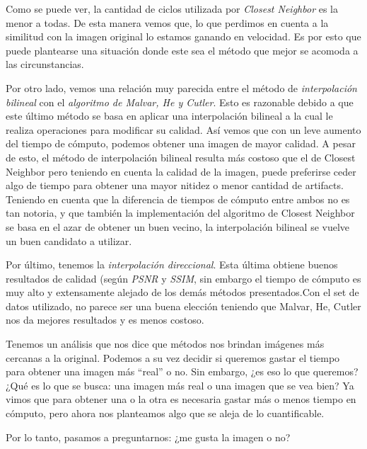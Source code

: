 \begin{itemize}
\vspace{\baselineskip}

Como se puede ver, la cantidad de ciclos utilizada por \textit{Closest Neighbor} es la menor a todas. De esta manera vemos que, lo que perdimos en cuenta a la similitud con la imagen original lo estamos ganando en velocidad. Es por esto que puede plantearse una situación donde este sea el método que mejor se acomoda a las circunstancias. 

\vspace{\baselineskip}

Por otro lado, vemos una relación muy parecida entre el método de \textit{interpolación bilineal} con el \textit{algoritmo de Malvar, He y Cutler}. Esto es razonable debido a que este último método se basa en aplicar una interpolación bilineal a la cual le realiza operaciones para modificar su calidad. Así vemos que con un leve aumento del tiempo de cómputo, podemos obtener una imagen de mayor calidad. A pesar de esto, el método de interpolación bilineal resulta más costoso que el de Closest Neighbor pero teniendo en cuenta la calidad de la imagen, puede preferirse ceder algo de tiempo para obtener una mayor nitidez o menor cantidad de artifacts. Teniendo en cuenta que la diferencia de tiempos de cómputo entre ambos no es tan notoria, y que también la implementación del algoritmo de Closest Neighbor se basa en el azar de obtener un buen vecino, la interpolación bilineal se vuelve un buen candidato a utilizar.

\vspace{\baselineskip}

Por último, tenemos la \textit{interpolación direccional}. Esta última obtiene buenos resultados de calidad (según \textit{PSNR} y \textit{SSIM}, sin embargo el tiempo de cómputo es muy alto y extensamente alejado de los demás métodos presentados.Con el set de datos utilizado, no parece ser una buena elección teniendo que Malvar, He, Cutler nos da mejores resultados y es menos costoso.

\vspace{\baselineskip}

Tenemos un análisis que nos dice que métodos nos brindan imágenes más cercanas a la original. Podemos a su vez decidir si queremos gastar el tiempo para obtener una imagen más ``real'' o no. Sin embargo, ¿es eso lo que queremos? ¿Qué es lo que se busca: una imagen más real o una imagen que se vea bien? Ya vimos que para obtener una o la otra es necesaria gastar más o menos tiempo en cómputo, pero ahora nos planteamos algo que se aleja de lo cuantificable. 

\vspace{\baselineskip}

Por lo tanto, pasamos a preguntarnos: ¿me gusta la imagen o no?

\end{itemize}

